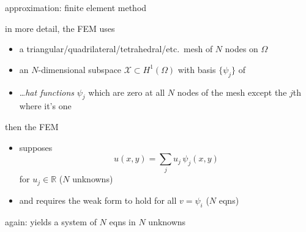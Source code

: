\documentclass[hide notes,intlimits,usenames,dvipsnames]{beamer}
\newcommand{\RR}{\mathbb{R}}
\begin{document}
\begin{frame}{approximation: finite element method}

in more detail, the FEM uses
\begin{itemize}
\item a {\footnotesize triangular/quadrilateral/tetrahedral/etc.}~mesh of $N$ nodes on $\Omega$
\item an $N$-dimensional subspace $\mathcal{X} \subset H^1(\Omega)$ with basis $\{\psi_j\}$ of
\item \begin{minipage}[t]{50mm}
\dots \emph{hat functions} $\psi_j$ which are zero at all $N$ nodes of the mesh except the $j$th where it's one
\end{minipage}
\qquad
\begin{minipage}[t]{40mm}
\vspace{-4mm}
\begin{tikzpicture}[scale=0.6, z={(.707,.3)}, baseline]

\end{tikzpicture}
\end{minipage}
\end{itemize}

then the FEM
\begin{itemize}
\item supposes
   $$u(x,y) = \sum_j u_{j}\, \psi_{j}(x,y)$$
for $u_j\in \RR$ ($N$ unknowns)
\item and requires the weak form to hold for all $v=\psi_i$ ($N$ eqns)
\end{itemize}

again: yields a system of $N$ eqns in $N$ unknowns
\end{frame}
\end{document}

